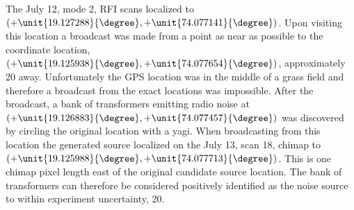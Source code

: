 \documentclass[a4paper,12pt]{article}
\begin{document}
                                                                                                                                                                                                                                                                                                                                                                                                                                                                                                                                                                                                                                                                                                                                                                                                                                                                                                                                                                                                                                                                                                                                                                                                                                                                                                                                                                                                                                                                                                                                                                                                                                         The July 12, mode 2, RFI scans localized to $(+\unit{19.127288}{\degree},+\unit{74.077141}{\degree})$. Upon visiting this location a broadcast was made from a point as near as possible to the coordinate location, $(+\unit{19.125938}{\degree},+\unit{74.077654}{\degree})$, approximately \unit{20}{\meter} away. Unfortunately the GPS location was in the middle of a grass field and therefore a broadcast from the exact locations was impossible. After the broadcast, a bank of transformers emitting radio noise at $(+\unit{19.126883}{\degree},+\unit{74.077457}{\degree})$ was discovered by circling the original location with a yagi. When broadcasting from this location the generated source localized on the July 13, scan 18, chimap to $(+\unit{19.125988}{\degree},+\unit{74.077713}{\degree})$. This is one chimap pixel length east of the original candidate source location. The bank of transformers can therefore be considered positively identified as the noise source to within experiment uncertainty, \unit{20}{\metre}.
\end{document}
